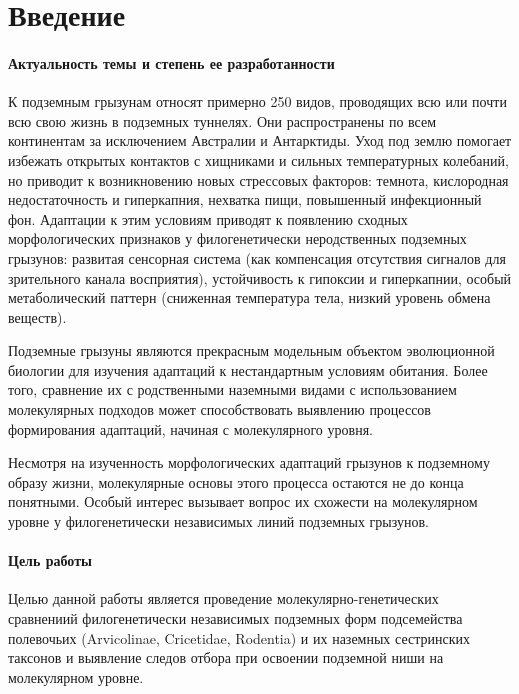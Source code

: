 \chapter*{Введение}							%

\subsubsection*{Актуальность темы и степень ее разработанности}
%
К подземным грызунам относят примерно 250 видов, проводящих всю или почти всю свою жизнь в подземных туннелях. Они распространены по всем континентам за исключением Австралии и Антарктиды. Уход под землю помогает избежать открытых контактов с хищниками и сильных температурных колебаний, но приводит к возникновению новых стрессовых факторов: темнота, кислородная недостаточность и гиперкапния, нехватка пищи, повышенный инфекционный фон. Адаптации к этим условиям приводят к появлению сходных морфологических признаков у филогенетически неродственных подземных грызунов: развитая сенсорная система (как компенсация отсутствия сигналов для зрительного канала восприятия), устойчивость к гипоксии и гиперкапнии, особый метаболический паттерн (сниженная температура тела, низкий уровень обмена веществ). 

Подземные грызуны являются прекрасным модельным объектом эволюционной биологии для изучения адаптаций к нестандартным условиям обитания. Более того, сравнение их с родственными наземными видами с использованием молекулярных подходов может способствовать выявлению процессов формирования адаптаций, начиная с молекулярного уровня. 

Несмотря на изученность морфологических адаптаций грызунов к подземному образу жизни, молекулярные основы этого процесса остаются не до конца понятными. Особый интерес вызывает вопрос их схожести на молекулярном уровне у филогенетически независимых линий подземных грызунов. 

\subsubsection* {Цель работы}

Целью данной работы является проведение молекулярно-генетических сравнениий филогенетически независимых подземных форм подсемейства полевочьих (Arvicolinae, Cricetidae, Rodentia) и их наземных сестринских таксонов и выявление следов отбора при освоении подземной ниши на молекулярном уровне.
\vspace{0pt plus0.5fill}


